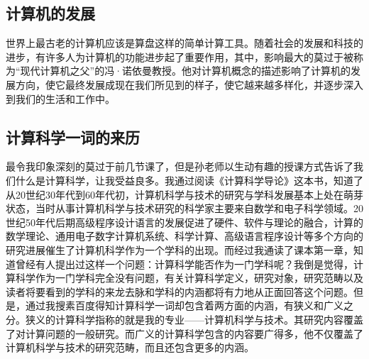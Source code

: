 \documentclass{article}
\begin{document}
\subsection{计算机的发展}
世界上最古老的计算机应该是算盘这样的简单计算工具。随着社会的发展和科技的进步，有许多人为计算机的功能进步起了重要作用，其中，影响最大的莫过于被称为“现代计算机之父”的冯·诺依曼教授。他对计算机概念的描述影响了计算机的发展方向，使它最终发展成现在我们所见到的样子，使它越来越多样化，并逐步深入到我们的生活和工作中。
\subsection{计算科学一词的来历}
最令我印象深刻的莫过于前几节课了，但是孙老师以生动有趣的授课方式告诉了我们什么是计算科学，让我受益良多。我通过阅读《计算科学导论》\cite{ref1}这本书，知道了从20世纪30年代到60年代初，计算机科学与技术的研究与学科发展基本上处在萌芽状态，当时从事计算机科学与技术研究的科学家主要来自数学和电子科学领域。20世纪50年代后期高级程序设计语言的发展促进了硬件、软件与理论的融合，计算的数学理论、通用电子数字计算机系统、科学计算、高级语言程序设计等多个方向的研究进展催生了计算机科学作为一个学科的出现。而经过我通读了课本第一章，知道曾经有人提出过这样一个问题：计算科学能否作为一门学科呢？我倒是觉得，计算科学作为一门学科完全没有问题，有关计算科学定义，研究对象，研究范畴以及读者将要看到的学科的来龙去脉和学科的内涵都将有力地从正面回答这个问题。但是，通过我搜素百度得知\cite{ref2}计算科学一词却包含着两方面的内涵，有狭义和广义之分。狭义的计算科学指称的就是我的专业——计算机科学与技术。其研究内容覆盖了对计算问题的一般研究。而广义的计算科学包含的内容要广得多，他不仅覆盖了计算机科学与技术的研究范畴，而且还包含更多的内涵。
\end{document}
